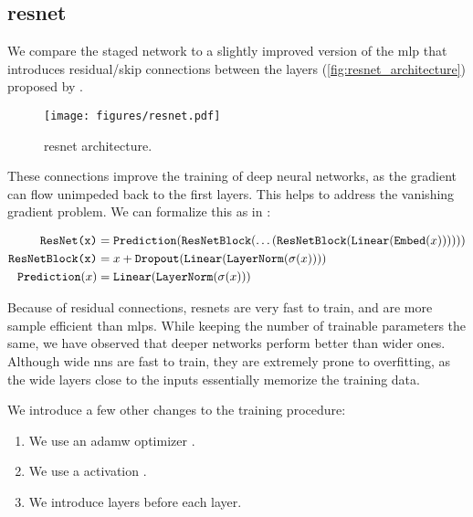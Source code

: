\subsection[Residual Neural Network]{\acrfull{resnet}}
\label{sec:resnet}

We compare the staged network to a slightly improved version of the \gls{mlp} that introduces residual/skip
connections between the layers (\autoref{fig:resnet_architecture}) proposed by \cite{resnet}.

\begin{figure}[htb]
    \centering
    \texttt{[image: figures/resnet.pdf]}
    \caption[ResNet architecture]{\gls{resnet} architecture.}
    \label{fig:resnet_architecture}
\end{figure}

These connections improve the training of deep neural networks, as the gradient can flow unimpeded back to the first
layers. This helps to address the vanishing gradient problem. We can formalize this as in
\cite{ft-transformer}:


{\fontsize{11}{10}\selectfont
\begin{align}
    \texttt{ResNet(x)}      & = \texttt{Prediction}(\texttt{ResNetBlock}(\dots(\texttt{ResNetBlock}(\texttt{Linear}(\texttt{Embed}(x)))))) \\
    \texttt{ResNetBlock(x)} & = x + \texttt{Dropout}(\texttt{Linear}(\texttt{LayerNorm}(\sigma(x))))                                               \\
    \texttt{Prediction}(x)  & = \texttt{Linear}(\texttt{LayerNorm}(\sigma(x)))
\end{align}
}


Because of residual connections, \glspl{resnet} are very fast to train, and are more sample efficient than \glspl{mlp}.
While keeping the number of trainable parameters the same, we have observed that deeper networks perform better than
wider ones.  Although wide \glspl{nn} are fast to train, they are extremely prone to overfitting, as the wide layers
close to the inputs essentially memorize the training data.


We introduce a few other changes to the training procedure:

\begin{enumerate}
    \item We use an \acrfull{adamw} optimizer \cite{adamw}.
    \item We use a \GELU activation \cite{gelu}.
    \item We introduce \LayerNorm \cite{layernorm} layers before each \Linear layer.
\end{enumerate}
